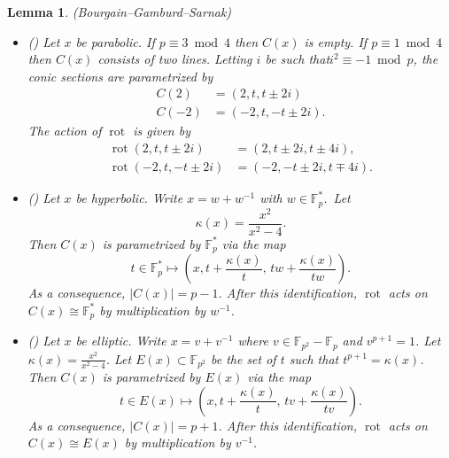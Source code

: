 \documentclass[10pt]{amsart}
\newtheorem{lemm}[theo]{Lemma}\newtheorem{prop}[theo]{Proposition}\newtheorem{coro}[theo]{Corollary}\newtheorem{conj}[theo]{Conjecture}
\theoremstyle{definition}\newtheorem{defi}[theo]{Definition}\newtheorem{rema}[theo]{Remark}\newtheorem{exam}[theo]{Example}\newtheorem{exem}[theo]{Example}\newtheorem{nota}[theo]{Notation}
\newcommand{\F}{\mathbb{F}}
\DeclareMathOperator{\rot}{rot}
\begin{document}
\begin{lemm}(Bourgain--Gamburd--Sarnak)\label{lem:BGS-lemmas}
\begin{itemize}
\item (\cite[Lemma~3]{BGS}) Let $x$ be parabolic. If $p\equiv3\bmod4$ then $C(x)$ is empty. If $p\equiv1\bmod4$ then $C(x)$ consists of two lines. Letting $i$ be such that\linebreak$i^{2}\equiv-1\bmod p$, the conic sections are parametrized by
\begin{align*}
C(2) &= (2,t,t \pm 2i) \\
C(-2) &= (-2,t,-t \pm 2i).
\end{align*}
The action of $\rot$ is given by
\begin{align*}
\rot(2,t,t\pm2i) &= (2,t\pm2i,t\pm4i), \\
\rot(-2,t,-t\pm2i) &= (-2,-t\pm2i,t\mp4i).
\end{align*}
\item (\cite[Lemma~4]{BGS}) Let $x$ be hyperbolic. Write $x=w+w^{-1}$ with $w\in\F_{p}^{*}$.~Let
\[
\kappa(x)=\frac{x^{2}}{x^{2}-4}.
\]
Then $C(x)$ is parametrized by $\F_{p}^{*}$ via the map
\[
t\in\F_{p}^{*} \mapsto \left(x,t+\frac{\kappa(x)}{t},\,tw+\frac{\kappa(x)}{tw}\right).
\]
As a consequence, $|C(x)|=p-1$. After this identification, $\rot$ acts on\linebreak$C(x)\cong\F_{p}^{*}$ by multiplication by $w^{-1}$.
\item (\cite[Lemma~5]{BGS}) Let $x$ be elliptic. Write $x=v+v^{-1}$ where $v\in\F_{p^{2}}-\F_{p}$ and $v^{p+1}=1$. Let $\kappa(x)=\frac{x^{2}}{x^{2}-4}$. Let $E(x)\subset\F_{p^{2}}$ be the set of $t$ such that $t^{p+1}=\kappa(x)$. Then $C(x)$ is parametrized by $E(x)$ via the map
\[
t\in E(x)\mapsto\left(x,t+\frac{\kappa(x)}{t},\,tv+\frac{\kappa(x)}{tv}\right).
\]
As a consequence, $|C(x)|=p+1$. After this identification, $\rot$ acts on\linebreak$C(x)\cong E(x)$ by multiplication by $v^{-1}$.
\end{itemize}
\end{lemm}
\end{document}
